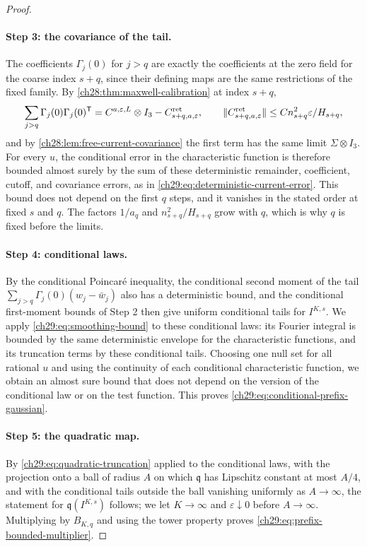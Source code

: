 \begin{proof}
\paragraph{Step 3: the covariance of the tail.}
The coefficients $\Gamma_j(0)$ for $j>q$ are exactly the coefficients at the zero field for the coarse index $s+q$, since their defining maps are the same restrictions of the fixed family. By \cref{ch28:thm:maxwell-calibration} at index $s+q$,
\[
 \sum_{j>q}\Gamma_j(0)\Gamma_j(0)^{\mathsf T}=C^{a,\varepsilon,L}\otimes I_3-C^{\rm ret}_{s+q,a,\varepsilon},\qquad \|C^{\rm ret}_{s+q,a,\varepsilon}\|\le Cn_{s+q}^2\varepsilon/H_{s+q},
\]
and by \cref{ch28:lem:free-current-covariance} the first term has the same limit $\Sigma\otimes I_3$. For every $u$, the conditional error in the characteristic function is therefore bounded almost surely by the sum of these deterministic remainder, coefficient, cutoff, and covariance errors, as in \eqref{ch29:eq:deterministic-current-error}. This bound does not depend on the first $q$ steps, and it vanishes in the stated order at fixed $s$ and $q$. The factors $1/a_q$ and $n_{s+q}^2/H_{s+q}$ grow with $q$, which is why $q$ is fixed before the limits.

\paragraph{Step 4: conditional laws.}
By the conditional Poincaré inequality, the conditional second moment of the tail $\sum_{j>q}\Gamma_j(0)(w_j-\bar w_j)$ also has a deterministic bound, and the conditional first-moment bounds of Step 2 then give uniform conditional tails for $I^{K,s}$. We apply \eqref{ch29:eq:smoothing-bound} to these conditional laws: its Fourier integral is bounded by the same deterministic envelope for the characteristic functions, and its truncation terms by these conditional tails. Choosing one null set for all rational $u$ and using the continuity of each conditional characteristic function, we obtain an almost sure bound that does not depend on the version of the conditional law or on the test function. This proves \eqref{ch29:eq:conditional-prefix-gaussian}.

\paragraph{Step 5: the quadratic map.}
By \eqref{ch29:eq:quadratic-truncation} applied to the conditional laws, with the projection onto a ball of radius $A$ on which $\mathfrak q$ has Lipschitz constant at most $A/4$, and with the conditional tails outside the ball vanishing uniformly as $A\to\infty$, the statement for $\mathfrak q(I^{K,s})$ follows; we let $K\to\infty$ and $\varepsilon\downarrow0$ before $A\to\infty$. Multiplying by $B_{K,q}$ and using the tower property proves \eqref{ch29:eq:prefix-bounded-multiplier}.
\end{proof}

